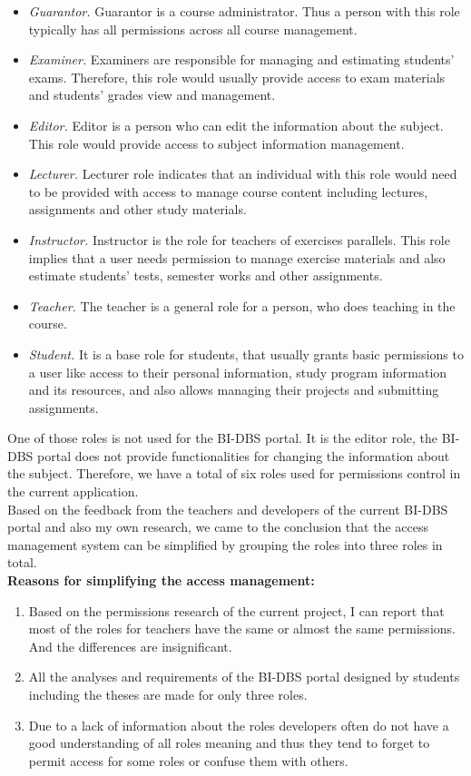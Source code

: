 \begin{itemize}
    \item \emph{Guarantor.} Guarantor is a course administrator. Thus a person with this role typically has all permissions across all course management.
    \item \emph{Examiner.} Examiners are responsible for managing and estimating students' exams. Therefore, this role would usually provide access to exam materials and students' grades view and management.
    \item \emph{Editor.} Editor is a person who can edit the information about the subject. This role would provide access to subject information management.
    \item \emph{Lecturer.} Lecturer role indicates that an individual with this role would need to be provided with access to manage course content including lectures, assignments and other study materials.
    \item \emph{Instructor.} Instructor is the role for teachers of exercises parallels. This role implies that a user needs permission to manage exercise materials and also estimate students' tests, semester works and other assignments.
    \item \emph{Teacher.} The teacher is a general role for a person, who does teaching in the course. 
    \item \emph{Student.} It is a base role for students, that usually grants basic permissions to a user like access to their personal information, study program information and its resources, and also allows managing their projects and submitting assignments.
\end{itemize}


\noindent One of those roles is not used for the BI-DBS portal. It is the editor role, the BI-DBS portal does not provide functionalities for changing the information about the subject. Therefore, we have a total of six roles used for permissions control in the current application.\\  
Based on the feedback from the teachers and developers of the current BI-DBS portal and also my own research, we came to the conclusion that the access management system can be simplified by grouping the roles into three roles in total.\\

\noindent \textbf{Reasons for simplifying the access management:}

\begin{enumerate}
    \item Based on the permissions research of the current project, I can report that most of the roles for teachers have the same or almost the same permissions. And the differences are insignificant.
    \item All the analyses and requirements of the BI-DBS portal designed by students including the theses are made for only three roles.
    \item Due to a lack of information about the roles developers often do not have a good understanding of all roles meaning and thus they tend to forget to permit access for some roles or confuse them with others.
\end{enumerate}

